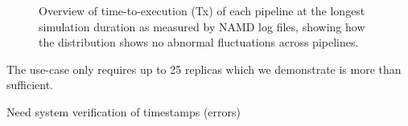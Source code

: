 \begin{figure}[!htbp]
  \centering
  \begin{minipage}[b]{0.55\textwidth}
  \centering
  \end{minipage}
  \begin{minipage}[b]{0.44\textwidth}
  \centering
  \end{minipage}
\caption{Overview of time-to-execution (Tx) of each pipeline at the longest simulation duration as measured by NAMD log files, showing how the distribution shows no abnormal fluctuations across pipelines.}
\label{fig:namd_logs}
\end{figure}



The use-case only requires up to 25 replicas which we demonstrate is more than sufficient. 




Need system verification of timestamps (errors) 




